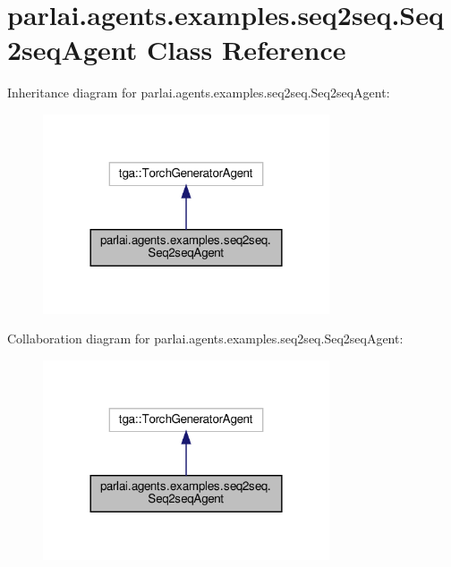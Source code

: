 \hypertarget{classparlai_1_1agents_1_1examples_1_1seq2seq_1_1Seq2seqAgent}{}\section{parlai.\+agents.\+examples.\+seq2seq.\+Seq2seq\+Agent Class Reference}
\label{classparlai_1_1agents_1_1examples_1_1seq2seq_1_1Seq2seqAgent}


Inheritance diagram for parlai.\+agents.\+examples.\+seq2seq.\+Seq2seq\+Agent\+:
\nopagebreak
\begin{figure}[H]
\begin{center}
\leavevmode
\includegraphics[width=240pt]{d5/d6d/classparlai_1_1agents_1_1examples_1_1seq2seq_1_1Seq2seqAgent__inherit__graph}
\end{center}
\end{figure}


Collaboration diagram for parlai.\+agents.\+examples.\+seq2seq.\+Seq2seq\+Agent\+:
\nopagebreak
\begin{figure}[H]
\begin{center}
\leavevmode
\includegraphics[width=240pt]{d0/ddb/classparlai_1_1agents_1_1examples_1_1seq2seq_1_1Seq2seqAgent__coll__graph}
\end{center}
\end{figure}
